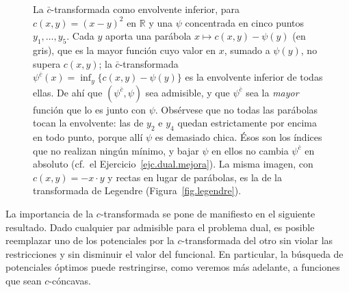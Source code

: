\documentclass[12pt, a4paper]{amsbook}
\newcommand{\R}{{\mathbb R}}
\theoremstyle{remark}
\theoremstyle{definition}
\numberwithin{section}{chapter}
\numberwithin{subsection}{section}
\numberwithin{equation}{section}
\numberwithin{figure}{chapter}
\begin{document}
\begin{figure}[ht]
\caption{La $\bar c$-transformada como envolvente inferior, para
$c(x,y)=(x-y)^2$ en $\R$ y una $\psi$ concentrada en cinco puntos
$y_1,\dots,y_5$. Cada $y$ aporta una parábola
$x\mapsto c(x,y)-\psi(y)$ (en gris), que es la mayor función cuyo valor en
$x$, sumado a $\psi(y)$, no supera $c(x,y)$; la $\bar c$-transformada
$\psi^{\bar c}(x)=\inf_y\{c(x,y)-\psi(y)\}$ es la envolvente inferior de todas
ellas. De ahí que $(\psi^{\bar c},\psi)$ sea admisible, y que $\psi^{\bar c}$
sea la \emph{mayor} función que lo es junto con $\psi$. Obsérvese que no todas
las parábolas tocan la envolvente: las de $y_2$ e $y_4$ quedan estrictamente
por encima en todo punto, porque allí $\psi$ es demasiado chica. Ésos son los
índices que no realizan ningún mínimo, y bajar $\psi$ en ellos no cambia
$\psi^{\bar c}$ en absoluto (cf.\ el Ejercicio~\ref{ejc.dual.mejora}). La
misma imagen, con $c(x,y)=-x\cdot y$ y rectas en lugar de parábolas, es la de
la transformada de Legendre (Figura~\ref{fig.legendre}).}
\label{fig.ctransformada.envolvente}
\end{figure}

La importancia de la \(c\)-transformada se pone de manifiesto en el siguiente
resultado. Dado cualquier par admisible para el problema dual, es posible
reemplazar uno de los potenciales por la \(c\)-transformada del otro sin
violar las restricciones y sin disminuir el valor del funcional. En
particular, la búsqueda de potenciales óptimos puede restringirse, como
veremos más adelante, a funciones que sean \(c\)-cóncavas.
\end{document}
